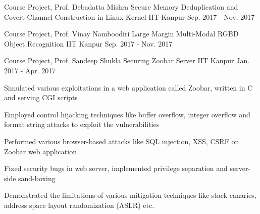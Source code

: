 \documentclass[11pt, a4paper]{cv}
\begin{document}
\begin{cventries}

  \cventry
    {Course Project, Prof. Debadatta Mishra} %
    {Secure Memory Deduplication and Covert Channel Construction in Linux Kernel} %
    {IIT Kanpur} %
    {Sep. 2017 - Nov. 2017} %
    {
      \begin{cvitems} %
        \item {}
      \end{cvitems}
    }

  \cventry
    {Course Project, Prof. Vinay Namboodiri} %
    {Large Margin Multi-Modal RGBD Object Recognition} %
    {IIT Kanpur} %
    {Sep. 2017 - Nov. 2017} %
    {
      \begin{cvitems} %
        \item {}
      \end{cvitems}
    }

  \cventry
    {Course Project, Prof. Sandeep Shukla} %
    {Securing Zoobar Server} %
    {IIT Kanpur} %
    {Jan. 2017 - Apr. 2017} %
    {
      \begin{cvitems} %
        \item {Simulated various exploitations in a web application called Zoobar, written in C and serving CGI scripts}
        \item {Employed control hijacking techniques like buffer overflow, integer overflow and format string attacks to exploit the vulnerabilities}
        \item {Performed various browser-based attacks like SQL injection, XSS, CSRF on Zoobar web application}
        \item {Fixed security bugs in web server, implemented privilege separation and server-side sand-boxing}
        \item {Demonstrated the limitations of various mitigation techniques like stack canaries, address space layout randomization (ASLR) etc.}
      \end{cvitems}
    }

\end{cventries}
\end{document}

